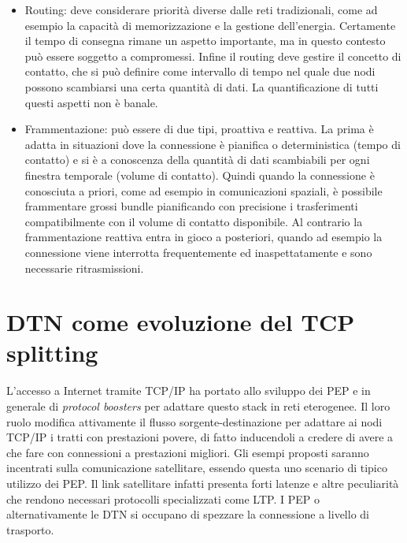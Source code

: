 \documentclass[12pt,a4paper,oneside]{book}
\begin{document}
\begin{itemize}
			\item Routing: deve considerare priorità diverse dalle reti tradizionali, come ad esempio la capacità di memorizzazione e la gestione dell'energia. Certamente il tempo di consegna rimane un aspetto importante, ma in questo contesto può essere soggetto a compromessi. Infine il routing deve gestire il concetto di contatto, che si può definire come intervallo di tempo nel quale due nodi possono scambiarsi una certa quantità di dati. La  quantificazione di tutti questi aspetti non è banale.
			
			\item Frammentazione: può essere di due tipi, proattiva e reattiva. La prima è adatta in situazioni dove la connessione è pianifica o deterministica (tempo di contatto) e si è a conoscenza della quantità di dati scambiabili per ogni finestra temporale (volume di contatto). Quindi quando la connessione è conosciuta a priori, come ad esempio in comunicazioni spaziali, è possibile frammentare grossi bundle pianificando con precisione i trasferimenti compatibilmente con il volume di contatto disponibile.
			Al contrario la frammentazione reattiva entra in gioco a posteriori, quando ad esempio la connessione viene interrotta frequentemente ed inaspettatamente e sono necessarie ritrasmissioni.
			
		\end{itemize}
		
		
		\section{DTN come evoluzione del TCP splitting}
		L'accesso a Internet tramite TCP/IP ha portato allo sviluppo dei PEP e in generale di {\it protocol boosters } per adattare questo stack in reti eterogenee. Il loro ruolo modifica attivamente il flusso sorgente-destinazione per adattare ai nodi TCP/IP i tratti con prestazioni povere, di fatto inducendoli a credere di avere a che fare con connessioni a prestazioni migliori. Gli esempi proposti saranno incentrati sulla comunicazione satellitare, essendo questa uno scenario di tipico utilizzo dei PEP. Il link satellitare infatti presenta forti latenze e altre peculiarità che rendono necessari protocolli specializzati come LTP. I PEP o alternativamente le DTN si occupano di spezzare la connessione a livello di trasporto.
		
\end{document}
